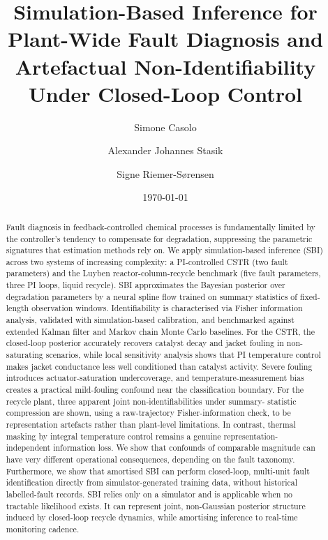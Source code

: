 \documentclass[aps,pre,twocolumn,superscriptaddress,floatfix]{revtex4-2}
\begin{document}
\title{
Simulation-Based Inference for Plant-Wide Fault Diagnosis and 
Artefactual Non-Identifiability Under
Closed-Loop Control
}

\author{Simone Casolo 
}

\author{Alexander Johannes Stasik }



\author{Signe Riemer-Sørensen
}

\date{\today}


\begin{abstract}
Fault diagnosis in feedback-controlled chemical processes is fundamentally
limited by the controller's tendency to compensate for degradation,
suppressing the parametric signatures that estimation methods rely on. We apply simulation-based inference
(SBI) across two systems of increasing complexity: a
PI-controlled CSTR (two fault parameters) and the Luyben
reactor-column-recycle benchmark (five fault parameters, three PI loops,
liquid recycle). SBI approximates the Bayesian posterior over degradation parameters by a neural spline
 flow trained on summary statistics of fixed-length
observation windows.
Identifiability is characterised via Fisher information
analysis, validated with simulation-based calibration, and benchmarked
against extended Kalman filter and Markov chain Monte Carlo baselines.
For the CSTR, the closed-loop posterior accurately recovers catalyst decay
and jacket fouling in non-saturating scenarios, while local sensitivity analysis
shows that PI temperature control makes jacket conductance less well conditioned than
catalyst activity. Severe fouling introduces actuator-saturation undercoverage, and
temperature-measurement bias creates a practical mild-fouling confound near the
classification boundary.
For the recycle plant, three apparent joint non-identifiabilities under summary-
statistic compression are shown, using a raw-trajectory Fisher-information check, to 
be representation artefacts rather than plant-level limitations. In contrast, 
thermal masking by integral temperature control remains a genuine representation-
independent information loss.
We show that confounds of comparable magnitude can have very different
operational consequences, depending on the fault taxonomy.
Furthermore, we show that amortised SBI can perform closed-loop, multi-unit fault 
identification directly from simulator-generated training data, without historical 
labelled-fault records.
SBI relies only on a simulator and is applicable when no tractable likelihood exists. 
It can represent joint, non-Gaussian posterior structure induced by closed-loop
recycle dynamics, while amortising inference to real-time monitoring cadence.
\end{abstract}
\end{document}
